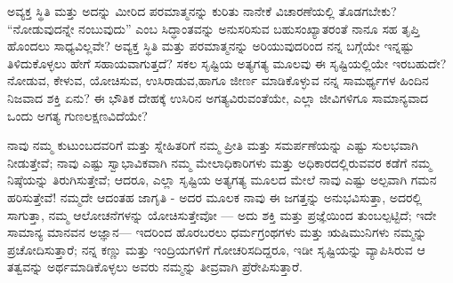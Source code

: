 \begin{mananam}{}
\nfntmtxt ಅವ್ಯಕ್ತ ಸ್ಥಿತಿ ಮತ್ತು ಅದನ್ನು ಮೀರಿದ ಪರಮಾತ್ಮನನ್ನು ಕುರಿತು ನಾನೇಕೆ ವಿಚಾರಣೆಯಲ್ಲಿ ತೊಡಗಬೇಕು? “ನೋಡುವುದನ್ನೇ ನಂಬುವುದು” ಎಂಬ  ಸಿದ್ಧಾಂತವನ್ನು ಅನುಸರಿಸುವ ಬಹುಸಂಖ್ಯಾತರಂತೆ ನಾನೂ ಸಹ ತೃಪ್ತಿ ಹೊಂದಲು ಸಾಧ್ಯವಿಲ್ಲವೇ? ಅವ್ಯಕ್ತ ಸ್ಥಿತಿ ಮತ್ತು ಪರಮಾತ್ಮನನ್ನು ಅರಿಯುವುದರಿಂದ ನನ್ನ ಬಗ್ಗೆಯೇ ಇನ್ನಷ್ಟು ತಿಳಿದುಕೊಳ್ಳಲು ಹೇಗೆ ಸಹಾಯವಾಗುತ್ತದೆ? ಸಕಲ ಸೃಷ್ಟಿಯ ಅತ್ಯಗತ್ಯ ಮೂಲವು ಈ ಸೃಷ್ಟಿಯಲ್ಲಿಯೇ ಇರಬಹುದೇ? ನೋಡುವ, ಕೇಳುವ, ಯೋಚಿಸುವ, ಉಸಿರಾಡುವ,ಹಾಗೂ ಜೀರ್ಣ ಮಾಡಿಕೊಳ್ಳುವ ನನ್ನ ಸಾಮರ್ಥ್ಯಗಳ ಹಿಂದಿನ ನಿಜವಾದ ಶಕ್ತಿ ಏನು? ಈ ಭೌತಿಕ ದೇಹಕ್ಕೆ ಉಸಿರಿನ ಅಗತ್ಯವಿರುವಂತೆಯೇ, ಎಲ್ಲಾ ಜೀವಿಗಳಿಗೂ ಸಾಮಾನ್ಯವಾದ ಒಂದು ಅಗತ್ಯ ಗುಣಲಕ್ಷಣವಿದೆಯೇ? 
\end{mananam}
\sReflect
\begin{inspiration}{}
\nfntmtxt ನಾವು ನಮ್ಮ ಕುಟುಂಬದವರಿಗೆ ಮತ್ತು ಸ್ನೇಹಿತರಿಗೆ ನಮ್ಮ ಪ್ರೀತಿ ಮತ್ತು ಸಮರ್ಪಣೆಯನ್ನು ಎಷ್ಟು ಸುಲಭವಾಗಿ ನೀಡುತ್ತೇವೆ; ನಾವು ಎಷ್ಟು ಸ್ವಾಭಾವಿಕವಾಗಿ ನಮ್ಮ  ಮೇಲಾಧಿಕಾರಿಗಳು ಮತ್ತು ಅಧಿಕಾರದಲ್ಲಿರುವವರ ಕಡೆಗೆ ನಮ್ಮ ನಿಷ್ಠೆಯನ್ನು ತಿರುಗಿಸುತ್ತೇವೆ; ಆದರೂ, ಎಲ್ಲಾ ಸೃಷ್ಟಿಯ ಅತ್ಯಗತ್ಯ ಮೂಲದ ಮೇಲೆ ನಾವು ಎಷ್ಟು ಅಲ್ಪವಾಗಿ ಗಮನ ಹರಿಸುತ್ತೇವೆ!
ನಮ್ಮದೇ ಆದಂತಹ ಜಾಗೃತಿ - ಅದರ ಮೂಲಕ ನಾವು ಈ ಜಗತ್ತನ್ನು ಅನುಭವಿಸುತ್ತಾ, ಅದರಲ್ಲಿ ಸಾಗುತ್ತಾ, ನಮ್ಮ ಆಲೋಚನೆಗಳನ್ನು ಯೋಚಿಸುತ್ತೇವೋ — ಅದು ಶಕ್ತಿ ಮತ್ತು ಪ್ರಜ್ಞೆಯಿಂದ ತುಂಬಲ್ಪಟ್ಟಿದೆ; ಇದೇ ಸಾಮಾನ್ಯ ಮಾನವನ ಅಜ್ಞಾನ— ಇದರಿಂದ ಹೊರಬರಲು ಧರ್ಮಗ್ರಂಥಗಳು ಮತ್ತು ಋಷಿಮುನಿಗಳು ನಮ್ಮನ್ನು ಪ್ರಚೋದಿಸುತ್ತಾರೆ; ನನ್ನ ಕಣ್ಣು ಮತ್ತು ಇಂದ್ರಿಯಗಳಿಗೆ ಗೋಚರಿಸದಿದ್ದರೂ, ಇಡೀ ಸೃಷ್ಟಿಯನ್ನು ವ್ಯಾಪಿಸಿರುವ ಆ ತತ್ವವನ್ನು ಅರ್ಥಮಾಡಿಕೊಳ್ಳಲು ಅವರು ನಮ್ಮನ್ನು ತೀವ್ರವಾಗಿ ಪ್ರೆರೇಪಿಸುತ್ತಾರೆ. 
\end{inspiration}
\newpage


